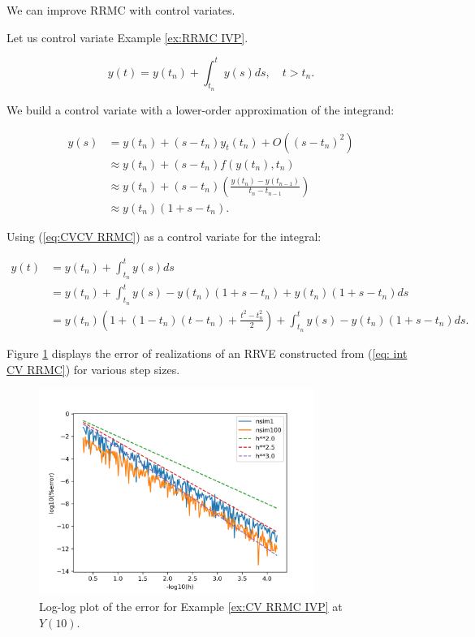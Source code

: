 \documentclass[a4paper,12pt]{article}
\begin{document}
We can improve RRMC with control variates.
\begin{example}[CV RRMC $y_t=y$]\label{ex:CV RRMC IVP}
    Let us control variate Example \ref{ex:RRMC IVP}.

    \begin{equation}
        y(t)= y(t_{n}) + \int_{t_{n}}^{t}y(s)ds , \quad t>t_{n}.
    \end{equation}

    We build a control variate with a lower-order approximation
    of the integrand:

    \begin{align}
        y(s) & = y(t_{n}) + (s-t_{n})y_t(t_{n}) + O((s-t_{n})^{2})      \\
             & \approx y(t_{n}) + (s-t_{n})f(y(t_{n}),t_{n})            \\
             & \approx y(t_{n}) +
        (s-t_{n})\left(\frac{y(t_{n})-y(t_{n-1})}{t_{n}-t_{n-1}}\right) \\
             & \approx y(t_{n})(1+s-t_{n}). \label{eq:CVCV RRMC}
    \end{align}

    Using (\ref{eq:CVCV RRMC}) as a control variate for the integral:

    \begin{align}
        y(t) & = y(t_{n}) + \int_{t_{n}}^{t}y(s)ds                                          \\
             & = y(t_{n}) + \int_{t_{n}}^{t}y(s)-y(t_{n})(1+s-t_{n}) +y(t_{n})(1+s-t_{n})ds \\
             & = y(t_{n})\left(1 + (1-t_{n})(t-t_{n})+\frac{t^{2}-t_{n}^{2}}{2}\right)
        + \int_{t_{n}}^{t}y(s)-y(t_{n})(1+s-t_{n})ds. \label{eq: int CV RRMC}
    \end{align}

    Figure \ref{fig:CV RRMC IVP} displays the error
    of realizations of an RRVE constructed from (\ref{eq: int CV RRMC})
    for various step sizes.

    \begin{figure}[h!]
        \centering
        \includegraphics[width=0.8\textwidth]{plots/CV RRMC IVP.png}
        \caption{Log-log plot of the error for Example
            \ref{ex:CV RRMC IVP} at $Y(10)$.}
        \label{fig:CV RRMC IVP}
    \end{figure}
\end{example}
\end{document}
